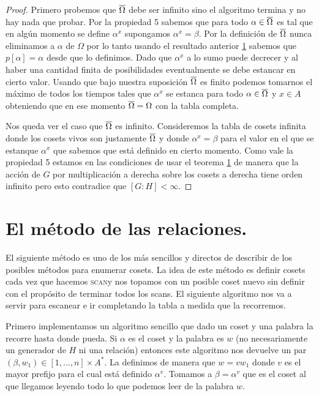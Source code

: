 \documentclass[tesis.tex]{subfiles}
\newcommand{\scan}{\textsc{scan}}
\begin{document}
\begin{proof}
	Primero probemos que $\overline \Omega$ debe ser infinito sino el algoritmo termina y no hay nada que probar.
	Por la propiedad 5 sabemos que para todo $\alpha \in \overline \Omega$ es tal que en algún momento se define $\alpha^x$ supongamos $\alpha^x = \beta$. 
	Por la definición de $\overline \Omega$ nunca eliminamos a $\alpha$ de $\Omega$ por lo tanto usando el resultado anterior \ref{} sabemos que $p[\alpha] = \alpha$ desde que lo definimos.
	Dado que $\alpha^x$ a lo sumo puede decrecer y al haber una cantidad finita de posibilidades eventualmente se debe estancar en cierto valor. 
	Usando que bajo nuestra suposición $\overline \Omega$ es finito podemos tomarnos el máximo de todos los tiempos tales que $\alpha^x$ se estanca para todo $\alpha \in \overline \Omega$ y $x \in A$ obteniendo que en ese momento $\overline \Omega = \Omega$ con la tabla completa.  
	
	Nos queda ver el caso que $\overline \Omega$ es infinito.
	Consideremos la tabla de cosets infinita donde los cosets vivos son justamente $\overline \Omega$ y donde $\alpha^x = \beta$ para el valor en el que se estanque $\alpha^x$ que sabemos que está definido en cierto momento. 
	Como vale la propiedad 5 estamos en las condiciones de usar el teorema \ref{} 
	de manera que la acción de $G$ por multiplicación a derecha sobre los cosets a derecha tiene orden infinito pero esto contradice que $[G:H] < \infty$.	
\end{proof}


\section{El método de las relaciones.}

El siguiente método es uno de los más sencillos y directos de describir de los posibles métodos para enumerar cosets.
La idea de este método es definir cosets cada vez que hacemos \scan y nos topamos con un posible coset nuevo sin definir con el propósito de terminar todos los scans.
El siguiente algoritmo nos va a servir para escanear e ir completando la tabla a medida que la recorremos.


Primero implementamos un algoritmo sencillo que dado un coset y una palabra la recorre hasta donde pueda.
Si $\alpha$ es el coset y la palabra es $w$ (no necesariamente un generador de $H$ ni una relación) entonces este algoritmo nos devuelve un par $(\beta, w_1) \in [1, \dots, n] \times A^{*}$.
La definimos de manera que $w = vw_1$ donde $v$ es el mayor prefijo para el cual está definido $\alpha^v$.
Tomamos a $\beta = \alpha^v$ que es el coset al que llegamos leyendo todo lo que podemos leer de la palabra $w$.
\end{document}
